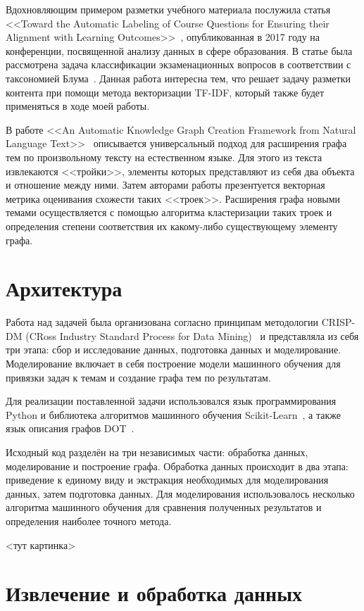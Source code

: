 \documentclass[14pt]{matmex-diploma-custom}
\begin{document}
Вдохновляющим примером разметки учебного материала послужила статья <<Toward the Automatic Labeling of Course Questions for
Ensuring their Alignment with Learning Outcomes>>~\cite{paper44}, опубликованная в 2017 году на конференции, посвященной анализу данных в сфере образования. В статье была рассмотрена задача классификации экзаменационных вопросов в соответствии с таксономией Блума~\cite{bloom}. Данная работа интересна тем, что решает задачу разметки контента при помощи метода векторизации TF-IDF, который также будет применяться в ходе моей работы.

В работе <<An Automatic Knowledge Graph Creation Framework from
Natural Language Text>>~\cite{autograph} описывается универсальный подход для расширения графа тем по произвольному тексту на естественном языке. Для этого из текста извлекаются <<тройки>>, элементы которых представляют из себя два объекта и отношение между ними. Затем авторами работы презентуется векторная метрика оценивания схожести таких <<троек>>. Расширения графа новыми темами осуществляется с помощью алгоритма кластеризации таких троек и определения степени соответствия их какому-либо существующему элементу графа.

\section{Архитектура}

Работа над задачей была организована согласно принципам методологии CRISP-DM (CRoss Industry Standard Process for Data Mining)~\cite{crispdm} и представляла из себя три этапа: сбор и исследование данных, подготовка данных и моделирование. Моделирование включает в себя построение модели машинного обучения для привязки задач к темам и создание графа тем по результатам.

Для реализации поставленной задачи использовался язык программирования Python и библиотека алгоритмов машинного обучения Scikit-Learn~\cite{sklearn}, а также язык описания графов DOT~\cite{dot}.

Исходный код разделён на три независимых части: обработка данных, моделирование и построение графа. Обработка данных происходит в два этапа: приведение к единому виду и экстракция необходимых для моделирования данных, затем подготовка данных. Для моделирования использовалось несколько алгоритма машинного обучения для сравнения полученных результатов и определения наиболее точного метода.

<тут картинка>

\section{Извлечение и обработка данных}
\end{document}

